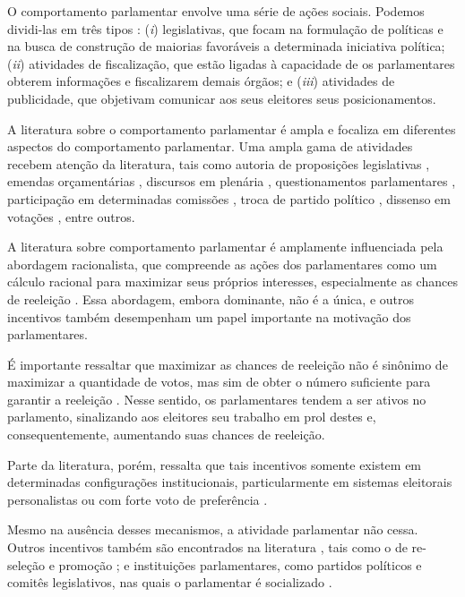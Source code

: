 O comportamento parlamentar envolve uma série de ações sociais. Podemos dividi-las em três tipos \cite{behm_sheep_2019}: (\textit{i}) legislativas, que focam na formulação de políticas e na busca de construção de maiorias favoráveis a determinada iniciativa política; (\textit{ii}) atividades de fiscalização, que estão ligadas à capacidade de os parlamentares obterem informações e fiscalizarem demais órgãos; e (\textit{iii}) atividades de publicidade, que objetivam comunicar aos seus eleitores seus posicionamentos. 

A literatura sobre o comportamento parlamentar é ampla e focaliza em diferentes aspectos do comportamento parlamentar. Uma ampla gama de atividades recebem atenção da literatura, tais como autoria de proposições legislativas \cite{crisp2007incentives, gagliarducci2011electoral}, emendas orçamentárias \cite{kerevel2015pork}, discursos em plenária  \cite{proksch2012institutional}, questionamentos parlamentares \cite{fernandes2019impact, russo2021mps}, participação em determinadas comissões  \cite{crisp2007incentives,stratmann2002plurality}, troca de partido político \cite{klein2018personal}, dissenso em votações  \cite{carey2007competing, sieberer2010behavioral}, entre outros.

A literatura sobre comportamento parlamentar é amplamente influenciada pela abordagem racionalista, que compreende as ações dos parlamentares como um cálculo racional para maximizar seus próprios interesses, especialmente as chances de reeleição \cite{mayhew2004congress}. Essa abordagem, embora dominante, não é a única, e outros incentivos também desempenham um papel importante na motivação dos parlamentares.

É importante ressaltar que maximizar as chances de reeleição não é sinônimo de maximizar a quantidade de votos, mas sim de obter o número suficiente para garantir a reeleição \cite{mayhew2004congress}. Nesse sentido, os parlamentares tendem a ser ativos no parlamento, sinalizando aos eleitores seu trabalho em prol destes e, consequentemente, aumentando suas chances de reeleição.

Parte da literatura, porém, ressalta que tais incentivos somente existem em determinadas configurações institucionais, particularmente em sistemas eleitorais personalistas \cite{aleman2009comparing, kessler1996dynamics, krehbiel1995cosponsors} ou com forte voto de preferência \cite{brauninger2012personal}.

Mesmo na ausência desses mecanismos, a atividade parlamentar não cessa. Outros incentivos também são encontrados na literatura  \cite{strom1997rules}, tais como o de re-seleção e promoção \cite{martin2014electoral, rahat2001candidate,shomer2009candidate};  e instituições parlamentares, como partidos políticos e comitês legislativos, nas quais o parlamentar é socializado \cite{andeweg2011pathways, asher1973learning, louwerse_personalised_2016}.

